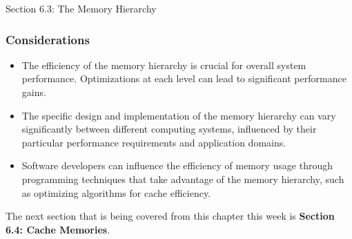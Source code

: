 \begin{notes}{Section 6.3: The Memory Hierarchy}
    \subsubsection*{Considerations}
    
    \begin{itemize}
        \item The efficiency of the memory hierarchy is crucial for overall system performance. Optimizations at each level can lead to significant performance gains.
        \item The specific design and implementation of the memory hierarchy can vary significantly between different computing systems, influenced by their particular performance requirements and 
        application domains.
        \item Software developers can influence the efficiency of memory usage through programming techniques that take advantage of the memory hierarchy, such as optimizing algorithms for cache efficiency.
    \end{itemize}
\end{notes}

The next section that is being covered from this chapter this week is \textbf{Section 6.4: Cache Memories}.


